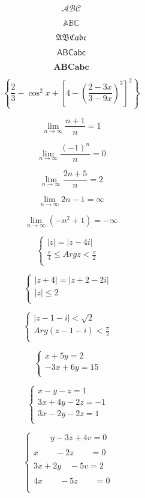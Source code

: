 \documentclass[10pt,a4paper]{article}
\begin{document}
$$\mathcal{ABC}$$

$$\mathbb{ABC}$$

$$\mathfrak{ABCabc}$$


$$\mathsf{ABCabc}$$

$$\mathbf{ABCabc}$$

$$ 
\left\{\frac{2}{3} - \cos ^2 x +  \left[4 - \left(\frac{2-3x}{3-9x}\right)^3\right]^2\right\}
$$

$$
\lim_{n\to\infty}\frac{n+1}{n} = 1
$$

$$
\lim_{n\to\infty}\frac{(-1)^n}{n} = 0
$$

$$
\lim_{n\to\infty}\frac{2n+5}{n} = 2
$$

$$
\lim_{n\to\infty}2n-1 = \infty
$$

$$
\lim_{n\to\infty}(-n^2 + 1) = -\infty
$$


$$
\left\{ \begin{array}{ll}
|z|=|z-4i| & \textrm{}\\
\frac{\pi}{4} \leq Argz < \frac{\pi}{2} & \textrm{}\\
\end{array} \right.
$$

$$
\left\{ \begin{array}{ll}
|z+4|=|z+2-2i| & \textrm{}\\
|z|\leq 2 & \textrm{}\\
\end{array} \right.
$$

$$
\left\{ \begin{array}{ll}
|z-1-i|< \sqrt{2} & \textrm{}\\
Arg(z-1-i) < \frac{\pi}{2} & \textrm{}\\
\end{array} \right.
$$

$$
\left\{ \begin{array}{ll}
x+5y=2 & \\
-3x + 6y = 15 & \\
\end{array} \right.
$$

$$
\left\{ \begin{array}{ll}
x-y-z = 1 & \\
3x+4y-2z = -1 & \\
3x-2y-2z = 1 & \\
\end{array} \right.
$$

$$
\left\{ \begin{array}{ll}
\qquad y-3z+4v = 0\\ & \\
x\qquad -2z\qquad = 0\\ & \\
3x+2y\quad -5v = 2\\ & \\
4x\qquad -5z \qquad= 0\\ & \\
\end{array} \right.
$$
\end{document}

